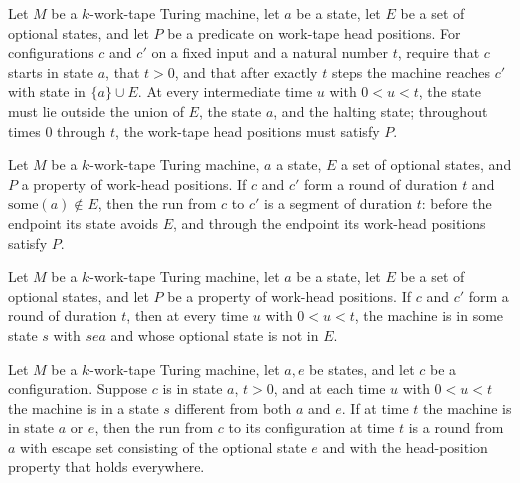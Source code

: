 \begin{definition}
\label{Turing.Round}
\leanok
{}
Let $M$ be a $k$-work-tape Turing machine, let $a$ be a state, let $E$ be a set of
optional states, and let $P$ be a predicate on work-tape head positions. For
configurations $c$ and $c'$ on a fixed input and a natural number $t$, require that $c$
starts in state $a$, that $t>0$, and that after exactly $t$ steps the machine reaches
$c'$ with state in $\bigl\{a\bigr\}\cup E$. At every intermediate time $u$ with $0<u<t$,
the state must lie outside the union of $E$, the state $a$, and the halting state;
throughout times $0$ through $t$, the work-tape head positions must satisfy $P$.
\end{definition}

\begin{theorem}
\label{Turing.Round.segment}
\leanok
{}
Let $M$ be a $k$-work-tape Turing machine, $a$ a state, $E$ a set of optional states,
and $P$ a property of work-head positions. If $c$ and $c'$ form a round of duration $t$
and $\mathrm{some}(a)\notin E$, then the run from $c$ to $c'$ is a segment of duration
$t$: before the endpoint its state avoids $E$, and through the endpoint its work-head
positions satisfy $P$.
\end{theorem}

\begin{theorem}
\label{Turing.Round.cut_some}
\leanok
{}
Let $M$ be a $k$-work-tape Turing machine, let $a$ be a state, let $E$ be a set of
optional states, and let $P$ be a property of work-head positions. If $c$ and $c'$ form
a round of duration $t$, then at every time $u$ with $0<u<t$, the machine is in some
state $s$ with $s
e a$ and whose optional state is not in $E$.
\end{theorem}

\begin{theorem}
\label{Turing.Round.of_cut}
\leanok
{}
Let $M$ be a $k$-work-tape Turing machine, let $a,e$ be states, and let $c$ be a
configuration. Suppose $c$ is in state $a$, $t>0$, and at each time $u$ with $0<u<t$ the
machine is in a state $s$ different from both $a$ and $e$. If at time $t$ the machine is
in state $a$ or $e$, then the run from $c$ to its configuration at time $t$ is a round
from $a$ with escape set consisting of the optional state $e$ and with the head-position
property that holds everywhere.
\end{theorem}

